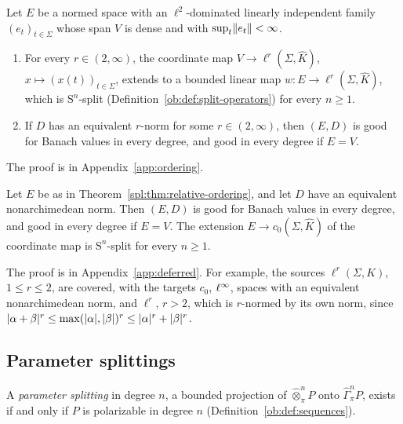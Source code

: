 \begin{theorem}\label{spl:thm:relative-ordering}
Let $E$ be a normed space with an $\ell^2$-dominated linearly independent family $(e_t)_{t\in\Sigma}$ whose span $V$ is
dense and with $\sup_t\lVert e_t\rVert<\infty$.
\begin{enumerate}
\item For every $r\in(2,\infty)$, the coordinate map $V\to\ell^r(\Sigma,\widehat K)$, $x\mapsto(x(t))_{t\in\Sigma}$,
extends to a bounded linear map $w\colon E\to\ell^r(\Sigma,\widehat K)$, which is $\mathrm S^n$-split
(Definition~\ref{ob:def:split-operators}) for every $n\ge1$.
\item If $D$ has an equivalent $r$-norm for some $r\in(2,\infty)$, then $(E,D)$ is good for Banach values in every degree,
and good in every degree if $E=V$.
\end{enumerate}
The proof is in Appendix~\ref{app:ordering}.
\end{theorem}

\begin{corollary}\label{spl:cor:relative-ordering-na}
Let $E$ be as in Theorem~\ref{spl:thm:relative-ordering}, and let $D$ have an equivalent nonarchimedean norm. Then
$(E,D)$ is good for Banach values in every degree, and good in every degree if $E=V$. The extension
$E\to c_0(\Sigma,\widehat K)$ of the coordinate map is $\mathrm S^n$-split for every $n\ge1$.
\end{corollary}

The proof is in Appendix~\ref{app:deferred}. For example, the sources $\ell^r(\Sigma,K)$, $1\le r\le2$, are covered, with the targets $c_0$, $\ell^\infty$, spaces with an
equivalent nonarchimedean norm, and $\ell^r$, $r>2$, which is $r$-normed by its own norm, since
$\lvert \alpha+\beta\rvert^r\le\max(\lvert \alpha\rvert,\lvert \beta\rvert)^r\le\lvert \alpha\rvert^r+\lvert \beta\rvert^r$.

\subsection{Parameter splittings}\label{spl:ssec:parameter}

A \emph{parameter splitting} in degree $n$, a bounded projection of $\widehat\otimes^n_\pi P$ onto $\widehat\Gamma^n_\pi P$,
exists if and only if $P$ is polarizable in degree $n$ (Definition~\ref{ob:def:sequences}).

